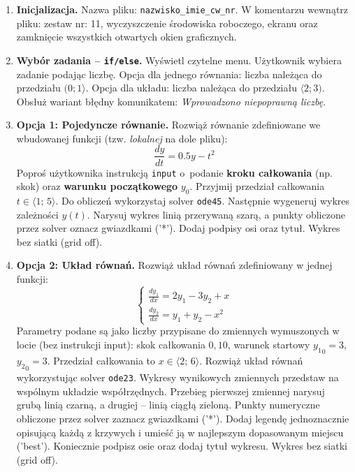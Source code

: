 \documentclass[a4paper,11pt]{article}
\begin{document}
\begin{enumerate}[leftmargin=*, label=\textbf{\arabic*.}, itemsep=2pt]

  \item \textbf{Inicjalizacja.}
    Nazwa pliku: \texttt{nazwisko\_imie\_cw\_nr}. W komentarzu wewnątrz pliku: zestaw nr: 11, wyczyszczenie środowiska roboczego, ekranu oraz zamknięcie wszystkich otwartych okien graficznych.

  \item \textbf{Wybór zadania -- \texttt{if/else}.}
    Wyświetl czytelne menu. Użytkownik wybiera zadanie podając liczbę. Opcja dla jednego równania: liczba należąca do przedziału $(0; 1\rangle$. Opcja dla układu: liczba należąca do przedziału $\langle 2; 3)$. Obsłuż wariant błędny komunikatem: \textit{Wprowadzono niepoprawną liczbę}.

  \item \textbf{Opcja 1: Pojedyncze równanie.}
    Rozwiąż równanie zdefiniowane we wbudowanej funkcji (tzw. \textit{lokalnej} na dole pliku):
    \[ \frac{dy}{dt} = 0.5y - t^2 \]
    Poproś użytkownika instrukcją \texttt{input} o~podanie \textbf{kroku całkowania} (np. skok) oraz \textbf{warunku początkowego} $y_0$. Przyjmij przedział całkowania $t \in \langle 1;\,5 \rangle$.
    Do obliczeń wykorzystaj solver \texttt{ode45}. Następnie wygeneruj wykres zależności $y(t)$. Narysuj wykres linią przerywaną szarą, a punkty obliczone przez solver oznacz gwiazdkami ('*'). Dodaj podpisy osi oraz tytuł. Wykres bez siatki (grid off).

  \item \textbf{Opcja 2: Układ równań.}
    Rozwiąż układ równań zdefiniowany w jednej funkcji:\\[-0.5em]
    \[
    \begin{cases}
      \frac{dy_1}{dx} = 2y_1 - 3y_2 + x \\
      \frac{dy_2}{dx} = y_1 + y_2 - x^2
    \end{cases}
    \]
    Parametry podane są jako liczby przypisane do zmiennych wymuszonych w locie (bez instrukcji input): skok całkowania $0{,}10$, warunek startowy $ {y_1}_{0} = 3 $, $ {y_2}_{0} = 3 $. Przedział całkowania to $x \in \langle 2;\,6 \rangle$.
    Rozwiąż układ równań wykorzystując solver \texttt{ode23}. Wykresy wynikowych zmiennych przedstaw na wspólnym układzie współrzędnych. Przebieg pierwszej zmiennej narysuj grubą linią czarną, a drugiej -- linią ciągłą zieloną. Punkty numeryczne obliczone przez solver zaznacz gwiazdkami ('*'). Dodaj legendę jednoznacznie opisującą każdą z krzywych i umieść ją w najlepszym dopasowanym miejscu ('best'). Koniecznie podpisz osie oraz dodaj tytuł wykresu. Wykres bez siatki (grid off).

\end{enumerate}
\end{document}
